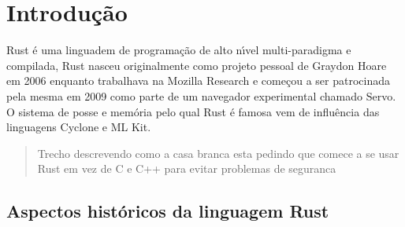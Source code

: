 
\chapter{ Introdu\c{c}\~{a}o}

Rust \'{e} uma linguadem de programa\c{c}\~{a}o de alto n\'{\i}vel multi-paradigma e compilada, Rust nasceu originalmente como projeto pessoal de Graydon Hoare em 2006 enquanto trabalhava na Mozilla Research e come\c{c}ou a ser patrocinada pela mesma em 2009 como parte de um navegador experimental chamado Servo. O sistema de posse e mem\'{o}ria pelo qual Rust \'{e} famosa vem de influ\^{e}ncia das linguagens Cyclone e ML Kit.


\begin{quote}


  Trecho descrevendo como a casa branca esta pedindo que comece a se usar Rust em vez de C e C++ para evitar problemas de seguranca

\end{quote}


\section{Aspectos hist\'{o}ricos da linguagem Rust}

